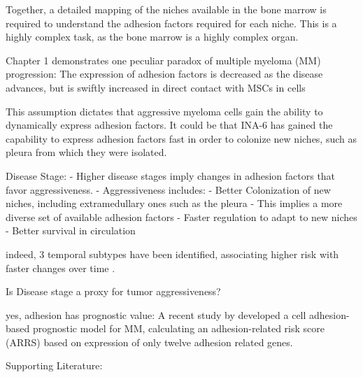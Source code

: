 Together, a detailed mapping of the niches available in the bone marrow is required
to understand the adhesion factors required for each niche. This is a highly
complex task, as the bone marrow is a highly complex organ.


\unnsubsection{\caddadaptabilitytitle}%
\label{sec:discussion_caddadaptability}%

Chapter 1 demonstrates one peculiar paradox of multiple myeloma
(MM) progression: The expression of adhesion factors is decreased as the
disease advances, but is swiftly increased in direct contact with \acp{MSC}
in \INA cells 

This assumption dictates that aggressive myeloma cells gain the ability
to dynamically express adhesion factors.
It could be that INA-6 has gained the capability to express adhesion factors
fast in order to colonize new niches, such as pleura from which they were
isolated.

Disease Stage:
- Higher disease stages imply changes in adhesion factors that favor aggressiveness.
- Aggressiveness includes:
- Better Colonization of new niches, including extramedullary ones such as the pleura
- This implies a more diverse set of available adhesion factors
- Faster regulation to adapt to new niches
- Better survival in circulation



indeed, 3 temporal subtypes have been identified, associating higher risk with
faster changes over time \cite{keatsClonalCompetitionAlternating2012}.

Is Disease stage a proxy for tumor aggressiveness?


yes, adhesion has prognostic value: A recent study by
\citet{huDevelopmentCellAdhesionbased2024} developed a cell adhesion-based
prognostic model for MM, calculating an adhesion-related risk score (ARRS) based
on expression of only twelve adhesion related genes.


Supporting Literature:

